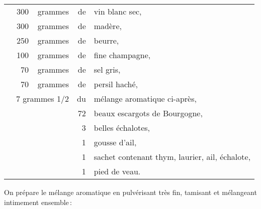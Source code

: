 \footnotesize
\begin{longtable}{rrrrp{16em}}   
  & 300 & grammes     & de & vin blanc sec,                                                               \\
  & 300 & grammes     & de & madère,                                                                      \\
  & 250 & grammes     & de & beurre,                                                                      \\
  & 100 & grammes     & de & fine champagne,                                                              \\
  &  70 & grammes     & de & sel gris,                                                                    \\
  &   70&  grammes    & de & persil haché,                                                                \\
  & \multicolumn{2}{r}{7 grammes 1/2} & du & mélange aromatique ci-après,                                 \\
  &     &             & 72 & beaux escargots de Bourgogne,                                                \\
  &     &             &  3 & belles échalotes,                                                            \\
  &     &             &  1 & gousse d'ail,                                                                \\
  &     &             &  1 & sachet contenant thym, laurier, ail, échalote,                               \\
  &     &             &  1 & pied de veau.                                                                \\
\end{longtable}
\normalsize

On prépare le mélange aromatique en pulvérisant très fin, tamisant et
mélangeant intimement ensemble :

\medskip

